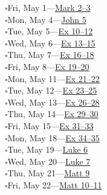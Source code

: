 \hypertarget{rp-2026-05-01}{}\noindent$\square$\enspace Fri, May 1\enspace---\enspace \hyperlink{ch-mark-2}{Mark 2--3}\\
\hypertarget{rp-2026-05-04}{}\noindent$\square$\enspace Mon, May 4\enspace---\enspace \hyperlink{ch-john-5}{John 5}\\
\hypertarget{rp-2026-05-05}{}\noindent$\square$\enspace Tue, May 5\enspace---\enspace \hyperlink{ch-exodus-10}{Ex 10--12}\\
\hypertarget{rp-2026-05-06}{}\noindent$\square$\enspace Wed, May 6\enspace---\enspace \hyperlink{ch-exodus-13}{Ex 13--15}\\
\hypertarget{rp-2026-05-07}{}\noindent$\square$\enspace Thu, May 7\enspace---\enspace \hyperlink{ch-exodus-16}{Ex 16--18}\\
\hypertarget{rp-2026-05-08}{}\noindent$\square$\enspace Fri, May 8\enspace---\enspace \hyperlink{ch-exodus-19}{Ex 19--20}\\
\hypertarget{rp-2026-05-11}{}\noindent$\square$\enspace Mon, May 11\enspace---\enspace \hyperlink{ch-exodus-21}{Ex 21--22}\\
\hypertarget{rp-2026-05-12}{}\noindent$\square$\enspace Tue, May 12\enspace---\enspace \hyperlink{ch-exodus-23}{Ex 23--25}\\
\hypertarget{rp-2026-05-13}{}\noindent$\square$\enspace Wed, May 13\enspace---\enspace \hyperlink{ch-exodus-26}{Ex 26--28}\\
\hypertarget{rp-2026-05-14}{}\noindent$\square$\enspace Thu, May 14\enspace---\enspace \hyperlink{ch-exodus-29}{Ex 29--30}\\
\hypertarget{rp-2026-05-15}{}\noindent$\square$\enspace Fri, May 15\enspace---\enspace \hyperlink{ch-exodus-31}{Ex 31--33}\\
\hypertarget{rp-2026-05-18}{}\noindent$\square$\enspace Mon, May 18\enspace---\enspace \hyperlink{ch-exodus-34}{Ex 34--35}\\
\hypertarget{rp-2026-05-19}{}\noindent$\square$\enspace Tue, May 19\enspace---\enspace \hyperlink{ch-luke-6}{Luke 6}\\
\hypertarget{rp-2026-05-20}{}\noindent$\square$\enspace Wed, May 20\enspace---\enspace \hyperlink{ch-luke-7}{Luke 7}\\
\hypertarget{rp-2026-05-21}{}\noindent$\square$\enspace Thu, May 21\enspace---\enspace \hyperlink{ch-matthew-9}{Matt 9}\\
\hypertarget{rp-2026-05-22}{}\noindent$\square$\enspace Fri, May 22\enspace---\enspace \hyperlink{ch-matthew-10}{Matt 10--11}\\
